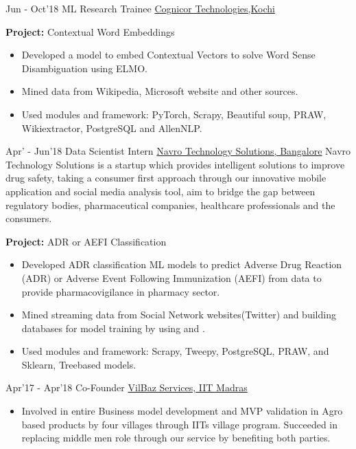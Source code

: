 \documentclass[letterpaper]{twentysecondcv} %
\begin{document}
    \begin{twenty}
        \twentyitem
            	{Jun -}
        		{Oct'18}
                {ML Research Trainee}
                {\href{https://www.cognicor.com/}{Cognicor Technologies,Kochi}}
                {}
                {
                \textbf{Project:} Contextual Word Embeddings
                    \begin{itemize}
                        \item Developed a model to embed Contextual Vectors to solve Word Sense Disambiguation using ELMO.
                        \item Mined data from Wikipedia, Microsoft website and other sources.  \item Used modules and framework: PyTorch, Scrapy, Beautiful soup, PRAW, Wikiextractor, PostgreSQL and AllenNLP.
                    \end{itemize}
                }
    \end{twenty} 
    \begin{twenty}
        \twentyitem
           		{Apr' -}
        		{Jun'18}
                {Data Scientist Intern}
                {\href{https://navrotech.com/}{Navro Technology Solutions, Bangalore}}
                {Navro Technology Solutions is a startup which provides intelligent solutions to improve drug safety, taking a consumer first approach through our innovative mobile application and social media analysis tool, aim to bridge the gap between regulatory bodies, pharmaceutical companies, healthcare professionals and the consumers.}
                {
                \textbf{Project:} ADR or AEFI Classification 
                
                \begin{itemize}
                    \item Developed ADR classification ML models to predict Adverse Drug
                Reaction (ADR) or Adverse Event Following Immunization (AEFI) from data to provide pharmacovigilance in pharmacy sector.
                    \item Mined streaming data from Social Network websites(Twitter) and building databases for model training by using  and .
                    \item Used modules and framework: Scrapy, Tweepy, PostgreSQL, PRAW,  and Sklearn, Treebased models.
                \end{itemize}
                }
    \end{twenty}
    \begin{twenty}
        \twentyitem
           		{Apr'17 -}
        		{Apr'18}
                {Co-Founder}
                {\href{}{VilBaz Services, IIT Madras}}
                {}
                {
                \begin{itemize}
                \item Involved in entire Business model development and MVP validation in Agro based products by four villages through IITs village program. Succeeded in replacing middle men role through our service by benefiting both parties.
            \end{itemize} }
    \end{twenty}
\end{document}
